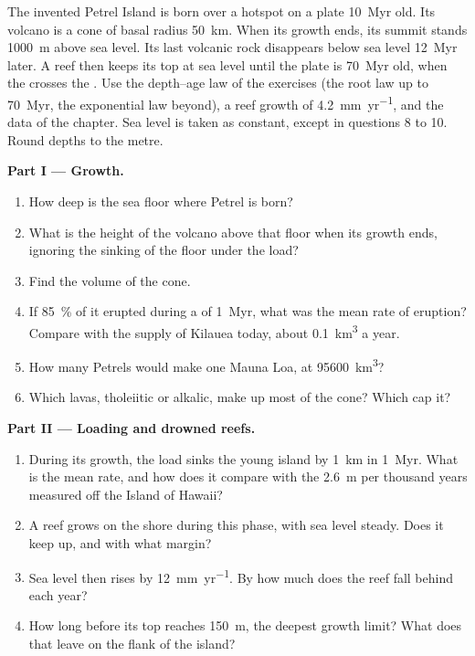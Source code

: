\begin{problem}\label{pb:b2:oceanic-islands:1}
The invented Petrel Island is born over a hotspot on a plate \qty{10}{Myr} old. Its volcano is
a cone of basal radius \qty{50}{km}. When its growth ends, its summit stands \qty{1000}{m} above
sea level. Its last volcanic rock disappears below sea level \qty{12}{Myr} later. A reef then
keeps its top at sea level until the plate is \qty{70}{Myr} old, when the  crosses the
. Use the depth--age law of the exercises (the root law up to \qty{70}{Myr}, the
exponential law beyond), a reef growth of \qty{4.2}{mm.yr^{-1}}, and the data of the chapter.
Sea level is taken as constant, except in questions 8 to 10. Round depths to the metre.

\noindent\textbf{Part I --- Growth.}
\begin{enumerate}
  \item How deep is the sea floor where Petrel is born?
  \item What is the height of the volcano above that floor when its growth ends, ignoring the
        sinking of the floor under the load?
  \item Find the volume of the cone.
  \item If \qty{85}{\percent} of it erupted during a  of \qty{1}{Myr}, what was the
        mean rate of eruption? Compare with the supply of Kilauea today, about
        \qty{0.1}{km^3} a year.
  \item How many Petrels would make one Mauna Loa, at \qty{95600}{km^3}?
  \item Which lavas, tholeiitic or alkalic, make up most of the cone? Which cap it?
\end{enumerate}

\noindent\textbf{Part II --- Loading and drowned reefs.}
\begin{enumerate}[resume]
  \item During its growth, the load sinks the young island by \qty{1}{km} in \qty{1}{Myr}. What is
        the mean rate, and how does it compare with the \qty{2.6}{m} per thousand years measured
        off the Island of Hawaii?
  \item A reef grows on the shore during this phase, with sea level steady. Does it keep up, and
        with what margin?
  \item Sea level then rises by \qty{12}{mm.yr^{-1}}. By how much does the reef fall behind each
        year?
  \item How long before its top reaches \qty{150}{m}, the deepest growth limit? What does that
        leave on the flank of the island?
\end{enumerate}


\end{problem}
